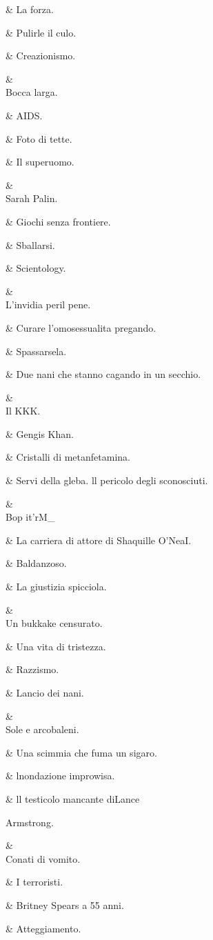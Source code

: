 &
La forza.

&
Pulirle il culo.

&
Creazionismo.

&
\\
Bocca larga.

&
AIDS.

&
Foto di tette.

&
Il superuomo.

&
\\
Sarah Palin.

&
Giochi senza
frontiere.

&
Sballarsi.

&
Scientology.

&
\\
L’invidia peril
pene.

&
Curare
l’omosessualita
pregando.

&
Spassarsela.

&
Due nani che
stanno cagando
in un secchio.

&
\\
Il KKK.

&
Gengis Khan.

&
Cristalli di
metanfetamina.

&
Servi della gleba.
ll pericolo degli
sconosciuti.

&
\\
Bop it'rM_

&
La carriera
di attore di
Shaquille O’NeaI.

&
Baldanzoso.

&
La giustizia
spicciola.

&
\\
Un bukkake
censurato.

&
Una vita di
tristezza.

&
Razzismo.

&
Lancio dei nani.

&
\\
Sole e
arcobaleni.

&
Una scimmia che
fuma un sigaro.

&
lnondazione
improwisa.

&
ll testicolo
mancante
diLance

Armstrong.

&
\\
Conati di vomito.

&
I terroristi.

&
Britney Spears a
55 anni.

&
Atteggiamento.

